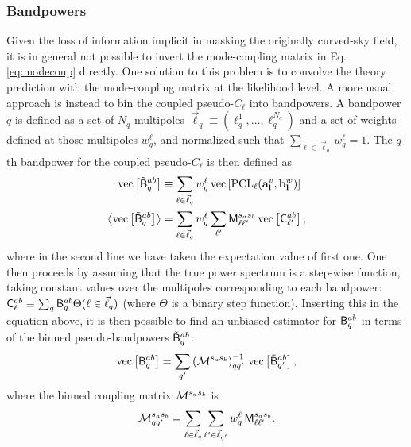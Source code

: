 \documentclass[usenatbib]{mnrasb}
\begin{document}
      \subsubsection{Bandpowers}\label{sssec:maths.pcl101.bpws}
        Given the loss of information implicit in masking the originally curved-sky field, it is in general not possible to invert the mode-coupling matrix in Eq. \ref{eq:modecoup} directly. One solution to this problem is to convolve the theory prediction with the mode-coupling matrix at the likelihood level. A more usual approach is instead to bin the coupled pseudo-$C_\ell$ into bandpowers. A bandpower $q$ is defined as a set of $N_q$ multipoles $\vec{\ell}_q\equiv(\ell_q^1,...,\ell_q^{N_q})$ and a set of weights defined at those multipoles $w^\ell_q$, and normalized such that $\sum_{\ell\in\vec{\ell}_q}w_q^\ell=1$. The $q$-th bandpower for the coupled pseudo-$C_\ell$ is then defined as
        \begin{align}\label{eq:bpws}
          {\rm vec}\left[\tilde{\sf B}^{ab}_q\right]&\equiv\sum_{\ell\in\vec{\ell}_q}w_q^\ell\,{\rm vec}\left[{\rm PCL}_{\ell}({\bf a}^v_{\bf l},{\bf b}^w_{\bf l})\right]\\\nonumber
          \left\langle{\rm vec}\left[\tilde{\sf B}^{ab}_q\right]\right\rangle&=\sum_{\ell\in\vec{\ell}_q}w_q^\ell\sum_{\ell'}{\sf M}^{s_as_b}_{\ell\ell'}\,{\rm vec}\left[{\sf C}^{ab}_{\ell'}\right],
        \end{align}
        where in the second line we have taken the expectation value of first one. One then proceeds by assuming that the true power spectrum is a step-wise function, taking constant values over the multipoles corresponding to each bandpower: ${\sf C}^{ab}_\ell\equiv\sum_q{\sf B}^{ab}_q\Theta(\ell\in\vec{\ell}_q)$ (where $\Theta$ is a binary step function). Inserting this in the equation above, it is then possible to find an unbiased estimator for ${\sf B}^{ab}_q$ in terms of the binned pseudo-bandpowers $\tilde{\sf B}^{ab}_q$:
        \begin{equation}\label{eq:decoup}
          {\rm vec}\left[{\sf B}^{ab}_q\right]=\sum_{q'}\left({\cal M}^{s_as_b}\right)^{-1}_{qq'}\,{\rm vec}\left[\tilde{\sf B}^{ab}_{q'}\right],
        \end{equation}
        where the binned coupling matrix ${\cal M}^{s_as_b}$ is
        \begin{equation}
          {\cal M}^{s_as_b}_{qq'}=\sum_{\ell\in\vec{\ell}_q}\sum_{\ell'\in\vec{\ell}_{q'}}w_q^\ell\,{\sf M}^{s_as_b}_{\ell\ell'}.
        \end{equation}
      
\end{document}
